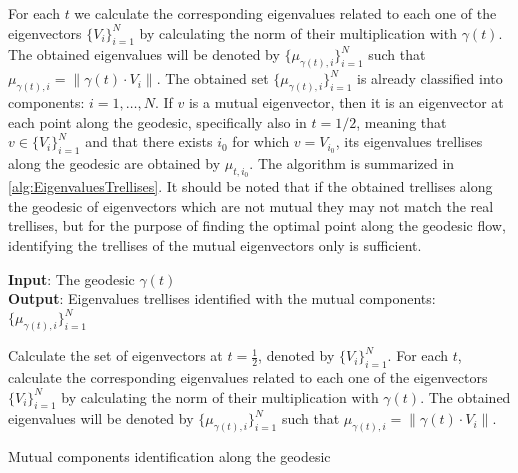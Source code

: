 \documentclass[]{article}
\theoremstyle{definition}
\begin{document}
	For each $t$ we calculate the corresponding eigenvalues related to each one of the eigenvectors $\{V_i\}_{i=1}^N$ by calculating the norm of their multiplication with $\gamma(t)$. The obtained eigenvalues will be denoted by $\{ \mu_{\gamma(t),i} \}_{i=1}^N$ such that $\mu_{\gamma(t),i}= \|\gamma(t)\cdot V_i \|$. The obtained set $\{ \mu_{\gamma(t),i} \}_{i=1}^N$ is already classified into components: $i=1,\ldots,N$. If $v$ is a mutual eigenvector, then it is an eigenvector at each point along the geodesic, specifically also in $t=1/2$, meaning that $v \in \{V_i\}_{i=1}^N$ and that there exists $i_0$ for which $v= V_{i_0}$, its eigenvalues trellises along the geodesic are obtained by $\mu_{t,i_0}$. The algorithm is summarized in \ref{alg:EigenvaluesTrellises}.
	It should be noted that if the obtained trellises along the geodesic of eigenvectors which are not mutual they may not match the real trellises, but for the purpose of finding the optimal point along the geodesic flow, identifying the trellises of the mutual eigenvectors only is sufficient. 
	
	\begin{algorithm}
		\hspace*{\algorithmicindent} \textbf{Input}: The geodesic $\gamma(t)$ \\
		\hspace*{\algorithmicindent} \textbf{Output}: Eigenvalues trellises identified with the mutual components:$\{ \mu_{\gamma(t),i} \}_{i=1}^N$ 
		\begin{algorithmic}[1]
			\State Calculate the set of eigenvectors at $t=\frac{1}{2}$, denoted by $\{V_i\}_{i=1}^N$.
			\State For each $t$, calculate the corresponding eigenvalues related to each one of the eigenvectors $\{V_i\}_{i=1}^N$ by calculating the norm of their multiplication with $\gamma(t)$. The obtained eigenvalues will be denoted by $\{ \mu_{\gamma(t),i} \}_{i=1}^N$ such that $\mu_{\gamma(t),i}= \|\gamma(t)\cdot V_i \|$. 
		\end{algorithmic}
		\caption{Mutual components identification along the geodesic}
		\label{alg:EigenvaluesTrellises}
	\end{algorithm}	
	 	
\end{document}
